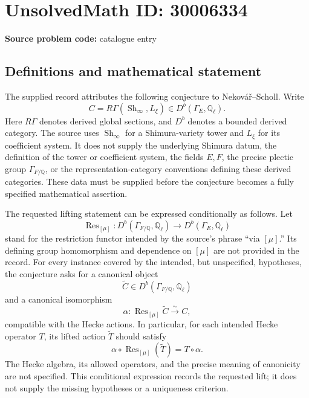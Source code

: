 \documentclass[11pt]{article}
\newcommand{\Q}{\mathbb{Q}}
\begin{document}
\section*{UnsolvedMath ID: 30006334}
\textbf{Source problem code:} catalogue entry
\subsection{Definitions and mathematical statement}
The supplied record attributes the following conjecture to Nekov\'a\v{r}--Scholl. Write
\[
C=R\Gamma(\operatorname{Sh}_\infty,L_\xi)
   \in D^b(\Gamma_E,\Q_\ell).
\]
Here \(R\Gamma\) denotes derived global sections, and \(D^b\) denotes a bounded derived category. The source uses \(\operatorname{Sh}_\infty\) for a Shimura-variety tower and \(L_\xi\) for its coefficient system. It does not supply the underlying Shimura datum, the definition of the tower or coefficient system, the fields \(E,F\), the precise plectic group \(\Gamma_{F/\Q}\), or the representation-category conventions defining these derived categories. These data must be supplied before the conjecture becomes a fully specified mathematical assertion.

The requested lifting statement can be expressed conditionally as follows. Let
\[
\operatorname{Res}_{[\mu]}:
D^b(\Gamma_{F/\Q},\Q_\ell)
\longrightarrow D^b(\Gamma_E,\Q_\ell)
\]
stand for the restriction functor intended by the source's phrase ``via \([\mu]\).'' Its defining group homomorphism and dependence on \([\mu]\) are not provided in the record. For every instance covered by the intended, but unspecified, hypotheses, the conjecture asks for a canonical object
\[
\widetilde C\in D^b(\Gamma_{F/\Q},\Q_\ell)
\]
and a canonical isomorphism
\[
\alpha:\operatorname{Res}_{[\mu]}\widetilde C
\xrightarrow{\ \sim\ } C,
\]
compatible with the Hecke actions. In particular, for each intended Hecke operator \(T\), its lifted action \(\widetilde T\) should satisfy
\[
\alpha\circ\operatorname{Res}_{[\mu]}(\widetilde T)
=T\circ\alpha.
\]
The Hecke algebra, its allowed operators, and the precise meaning of canonicity are not specified. This conditional expression records the requested lift; it does not supply the missing hypotheses or a uniqueness criterion.
\end{document}
